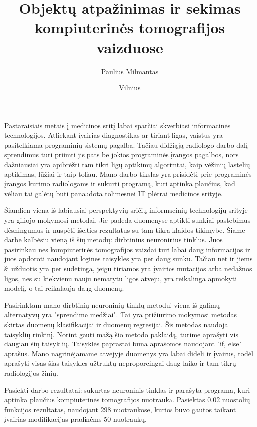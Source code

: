 \documentclass{VUMIFInfKursinis}
\title{Objektų atpažinimas ir sekimas kompiuterinės tomografijos vaizduose}
\author{Paulius Milmantas}
\date{Vilnius \\ \the\year}
\begin{document}
\maketitle

Pastaraisiais metais į medicinos sritį labai sparčiai skverbiasi informacinės technologijos. Atliekant
įvairias diagnostikas ar tiriant ligas, vaistus yra pasitelkiama programinių sistemų pagalba. Tačiau
didžiąją radiologo darbo dalį sprendimus turi priimti jis pats be jokios programinės įrangos pagalbos,
nors dažniausiai yra apibrėžti tam tikri ligų aptikimų algorimtai, kaip vėžinių lastelių aptikimas,
lūžiai ir taip toliau. Mano darbo tikslas yra prisidėti prie programinės įrangos kūrimo radiologams
ir sukurti programą, kuri aptinka plaučius, kad vėliau tai galėtų būti panaudota tolimesnei
IT plėtrai medicinos srityje.
\par
Šiandien viena iš labiausiai perspektyvių sričių informacinių technologijų srityje yra giliojo mokymosi
metodai.
Jie padeda duomenyse aptikti sunkiai pastebimus dėsningumus ir nuspėti išeities rezultatus su tam tikra klaidos tikimybe.
Šiame darbe kalbėsiu vieną iš šių metodų: dirbtinius neuroninius tinklus.
Juos pasirinkau nes kompiuterinės tomografijos vaizdai turi labai daug informacijos ir juos apdoroti
naudojant logines taisykles yra per daug sunku. Tačiau net ir jiems ši užduotis yra per sudėtinga, jeigu
tiriamos yra įvairios mutacijos arba nedažnos ligos, nes su kiekvienu nauju nematytu ligos atveju,
yra reikalinga apmokyti modelį, o tai reikalauja daug duomenų.
\par
Pasirinktam mano dirbtinių neuroninių tinklų metodui viena iš galimų alternatyvų yra "sprendimo medžiai".
Tai yra prižiūrimo mokymosi metodas skirtas duomenų klasifikacijai ir duomenų regresijai. Šis metodas
naudoja taisyklių rinkinį. Norint gauti mažą šio metodo paklaidą, turime aprašyti vis daugiau šių taisyklių.
Taisyklės paprastai būna aprašomos naudojant "if, else" aprašus.\cite{salt1} Mano nagrinėjamame atvejyje duomenys
yra labai dideli ir įvairūs, todėl aprašyti visas šias taisykles užtruktų neproporcingai daug laiko ir tam
tikrų radiologijos žinių.
\par
Pasiekti darbo rezultatai: sukurtas neuroninis tinklas ir parašyta programa, kuri aptinka plaučius kompiuterinės tomografijos
nuotrauka. Pasiektas 0.02 nuostolių funkcijos rezultatas, naudojant 298 nuotraukose, kurios buvo gautos taikant
įvairias modifikacijas pradinėms 50 nuotraukų.
\end{document}
